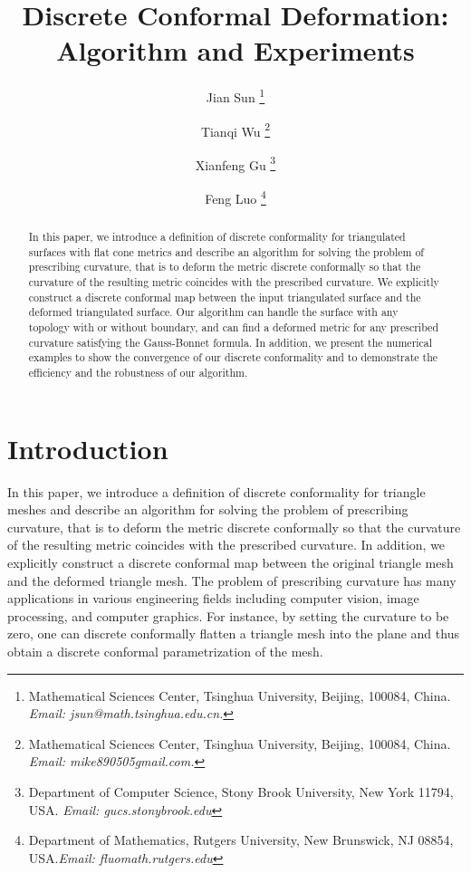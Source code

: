 \documentclass[11pt]{article}
\begin{document}
\title{Discrete Conformal Deformation: Algorithm and Experiments}

\author{ 
Jian Sun \thanks{Mathematical Sciences Center, Tsinghua University, Beijing, 100084, China. \textit{Email: jsun@math.tsinghua.edu.cn.}}
\and Tianqi Wu \thanks{Mathematical Sciences Center, Tsinghua University, Beijing, 100084, China. \textit{Email: mike890505gmail.com.}}
\and Xianfeng Gu \thanks{Department of Computer Science, Stony Brook University, New York 11794, USA. \textit{Email:  gucs.stonybrook.edu}}
\and Feng Luo \thanks{Department of Mathematics, Rutgers University, New Brunswick, NJ 08854, USA.\textit{Email: fluomath.rutgers.edu}}
}




\date{}


\maketitle

\begin{abstract}
In this paper, we introduce a definition of discrete conformality for
triangulated surfaces with flat cone metrics and describe an algorithm for solving the problem
of prescribing curvature, that is to deform the metric discrete conformally 
so that the curvature of the resulting metric coincides with the 
prescribed curvature. We explicitly construct a discrete conformal map 
between the input triangulated surface and the deformed triangulated surface.  
Our algorithm can handle the surface with any topology with or without boundary, 
and can find a deformed metric for any prescribed curvature  satisfying the 
Gauss-Bonnet formula. In addition, we present the numerical examples to show 
the convergence of 
our discrete conformality and to demonstrate the efficiency and the robustness
of our algorithm. 
\end{abstract}

\newpage
\section{Introduction}
In this paper, we introduce a definition of discrete conformality for
triangle meshes and describe an algorithm for solving the problem
of prescribing curvature, that is to deform the metric discrete conformally 
so that the curvature of the resulting metric coincides with the 
prescribed curvature. In addition, we explicitly construct a 
discrete conformal map between the original triangle mesh 
and the deformed triangle mesh. The problem of prescribing curvature
has many applications in various engineering fields including
computer vision, image processing, and computer graphics. 
For instance, by setting the curvature to be zero, one can discrete conformally
flatten a triangle mesh into the plane and thus obtain a discrete conformal 
parametrization of the mesh. 
\end{document}
